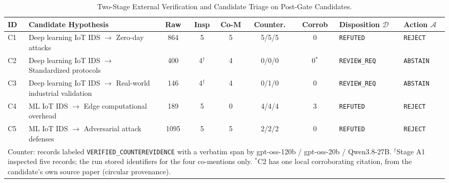 \documentclass[runningheads]{llncs}
\begin{document}
\begin{table}[htbp]
\centering
\caption{Two-Stage External Verification and Candidate Triage on Post-Gate Candidates.}
\label{tab:triage}
\scriptsize
\setlength{\tabcolsep}{2.0pt}
\begin{tabular}{p{0.4cm}p{2.5cm}cccccp{1.6cm}p{1.2cm}}
\toprule
\textbf{ID} & \textbf{Candidate Hypothesis} & \textbf{Raw} & \textbf{Insp} & \textbf{Co-M} & \textbf{Counter.} & \textbf{Corrob} & \textbf{Disposition $\mathcal{D}$} & \textbf{Action $\mathcal{A}$} \\
\midrule
C1 & Deep learning IoT IDS $\rightarrow$ Zero-day attacks & 864 & 5 & 5 & 5/5/5 & 0 & \texttt{REFUTED} & \texttt{REJECT} \\
C2 & Deep learning IoT IDS $\rightarrow$ Standardized protocols & 400 & 4$^\dagger$ & 4 & 0/0/0 & 0$^*$ & \texttt{REVIEW\_REQ} & \texttt{ABSTAIN} \\
C3 & Deep learning IoT IDS $\rightarrow$ Real-world industrial validation & 146 & 4$^\dagger$ & 4 & 0/1/0 & 0 & \texttt{REVIEW\_REQ} & \texttt{ABSTAIN} \\
C4 & ML IoT IDS $\rightarrow$ Edge computational overhead & 189 & 5 & 0 & 4/4/4 & 3 & \texttt{REFUTED} & \texttt{REJECT} \\
C5 & ML IoT IDS $\rightarrow$ Adversarial attack defenses & 1095 & 5 & 5 & 2/2/2 & 0 & \texttt{REFUTED} & \texttt{REJECT} \\
\bottomrule
\multicolumn{9}{p{11.5cm}}{\tiny Counter: records labeled \texttt{VERIFIED\_COUNTEREVIDENCE} with a verbatim span by gpt-oss-120b / gpt-oss-20b / Qwen3.8-27B. $^\dagger$Stage A1 inspected five records; the run stored identifiers for the four co-mentions only. $^*$C2 has one local corroborating citation, from the candidate's own source paper (circular provenance).}
\end{tabular}
\end{table}
\end{document}
